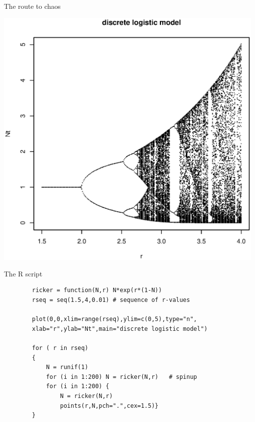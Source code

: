 \documentclass{eecslides}
\begin{document}
	\begin{frame}{The route to chaos}

		\begin{center}
			\includegraphics[height=0.75\textheight]{bifurcation_map}
		\end{center}

	\end{frame}
	\begin{frame}[fragile]{The R script}
		
	\begin{lstlisting}
		ricker = function(N,r) N*exp(r*(1-N)) 
		rseq = seq(1.5,4,0.01) # sequence of r-values

		plot(0,0,xlim=range(rseq),ylim=c(0,5),type="n",
		xlab="r",ylab="Nt",main="discrete logistic model")

		for ( r in rseq)
 		{
			N = runif(1)
		 	for (i in 1:200) N = ricker(N,r)   # spinup 
			for (i in 1:200) {
				N = ricker(N,r)
				points(r,N,pch=".",cex=1.5)}
		}
		\end{lstlisting}
	\end{frame}
\end{document}
